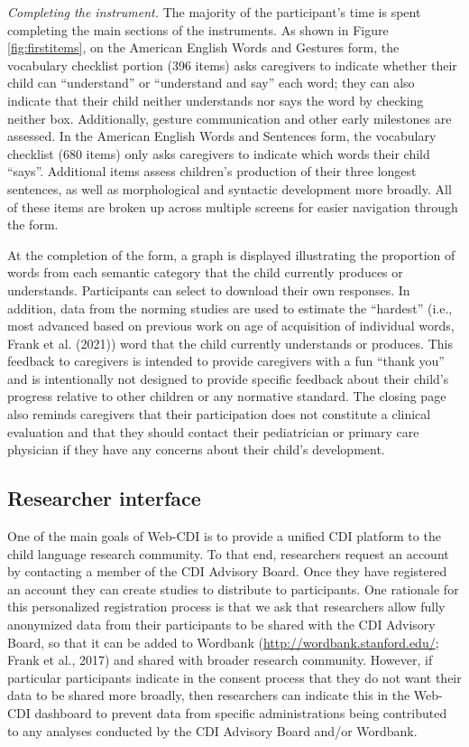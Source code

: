 \documentclass[
  english,
  ,man,floatsintext]{apa6}
\begin{document}
\emph{Completing the instrument.} The majority of the participant's time is spent completing the main sections of the instruments. As shown in Figure \ref{fig:firstitems}, on the American English Words and Gestures form, the vocabulary checklist portion (396 items) asks caregivers to indicate whether their child can \enquote{understand} or \enquote{understand and say} each word; they can also indicate that their child neither understands nor says the word by checking neither box. Additionally, gesture communication and other early milestones are assessed. In the American English Words and Sentences form, the vocabulary checklist (680 items) only asks caregivers to indicate which words their child \enquote{says}. Additional items assess children's production of their three longest sentences, as well as morphological and syntactic development more broadly. All of these items are broken up across multiple screens for easier navigation through the form.

At the completion of the form, a graph is displayed illustrating the proportion of words from each semantic category that the child currently produces or understands. Participants can select to download their own responses. In addition, data from the norming studies are used to estimate the \enquote{hardest} (i.e., most advanced based on previous work on age of acquisition of individual words, Frank et al. (2021)) word that the child currently understands or produces. This feedback to caregivers is intended to provide caregivers with a fun \enquote{thank you} and is intentionally not designed to provide specific feedback about their child's progress relative to other children or any normative standard. The closing page also reminds caregivers that their participation does not constitute a clinical evaluation and that they should contact their pediatrician or primary care physician if they have any concerns about their child's development.

\hypertarget{researcher-interface}{%
\subsection{Researcher interface}\label{researcher-interface}}

One of the main goals of Web-CDI is to provide a unified CDI platform to the child language research community. To that end, researchers request an account by contacting a member of the CDI Advisory Board. Once they have registered an account they can create studies to distribute to participants. One rationale for this personalized registration process is that we ask that researchers allow fully anonymized data from their participants to be shared with the CDI Advisory Board, so that it can be added to Wordbank (\url{http://wordbank.stanford.edu/}; Frank et al., 2017) and shared with broader research community. However, if particular participants indicate in the consent process that they do not want their data to be shared more broadly, then researchers can indicate this in the Web-CDI dashboard to prevent data from specific administrations being contributed to any analyses conducted by the CDI Advisory Board and/or Wordbank.
\end{document}
